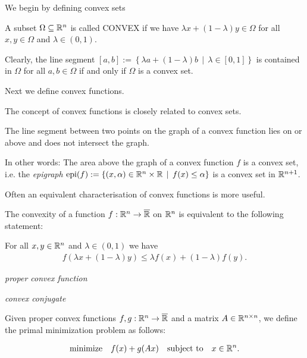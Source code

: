 We begin by defining convex sets
%

\begin{definition}
  A subset $\Omega\subseteq \mathbb{R}^n$ is called CONVEX if we have $\lambda x+(1-\lambda)y\in \Omega$ for all $x,y\in \Omega$ and $\lambda\in (0,1)$. 
\end{definition}

Clearly, the line segment 
$[a,b]:=\left\{ \lambda a+(1-\lambda)b\,\mid \, \lambda\in [0,1] \right\}$ is contained in $\Omega$ for all $a,b\in \Omega$ if and only if $\Omega$ is a convex set.
%

Next we define convex functions. 
%

The concept of convex functions is closely related to convex sets.
%  
 
The line segment between two points on the graph of a convex function lies on or above and does not intersect the graph.
%

In other words: The area above the graph of a convex function $f$ is a convex set, i.e. the \textit{epigraph}
$\text{epi}(f):=\left\{ (x,\alpha)\in \mathbb{R}^n\times\mathbb{R}\,\mid\, f(x)\le \alpha\right\}$ is a convex set in $\mathbb{R}^{n+1}$.
%

Often an equivalent characterisation of convex functions is more useful.
%

\begin{theorem}
  The convexity of a function $f:\mathbb{R}^n\to \overline{\mathbb{R}}$ on $\mathbb{R}^n$ is equivalent to the following statement:

  For all $x,y\in \mathbb{R}^n$ and $\lambda\in(0,1)$ we have 
    \begin{align}
      f(\lambda x + (1-\lambda)y)\le \lambda f(x)+(1-\lambda)f(y).
    \end{align}
\end{theorem}


\begin{definition}
  \emph{proper convex function}
\end{definition}

\begin{definition}
  \emph{convex conjugate}
\end{definition}

Given 
proper convex functions $f, g : \mathbb{R}^n \to \overline{\mathbb{R}}$ 
and
a matrix $A \in \mathbb{R}^{n \times n}$,
we define 
the primal minimization problem as follows:

\begin{gather}
  \label{cvxa_primal_problem}
  \text{minimize}
  \quad
  f(x) + g(Ax) 
  \quad
  \text{subject to}
  \quad
  x \in \mathbb{R}^n.
\end{gather}

